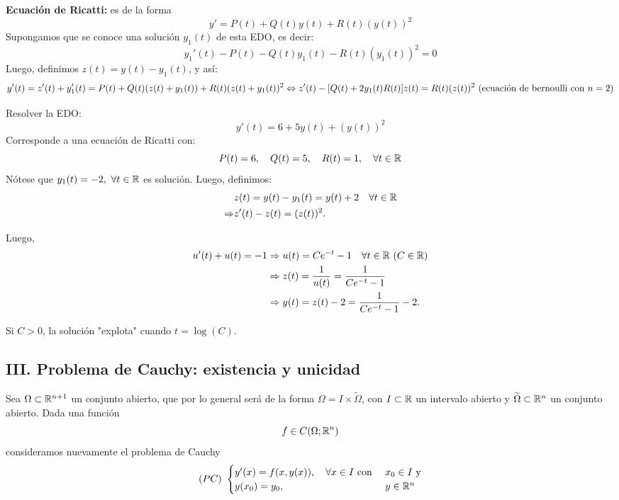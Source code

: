 	\noindent \textbf{Ecuación de Ricatti:} es de la forma
	\[ y' = P(t) + Q(t)y(t) + R(t)(y(t))^2 \]
	\noindent Supongamos que se conoce una solución $y_1(t)$ de esta EDO, es decir:
	\[ y_1'(t) - P(t) - Q(t)y_1(t) - R(t)(y_1(t))^2 = 0\]
	\noindent Luego, definimos $z(t) = y(t) - y_1(t)$, y así:
	\[ y'(t) = z'(t) + y_1'(t) = P(t) + Q(t)(z(t) + y_1(t)) + R(t)(z(t) + y_1(t))^2 \\
	\iff z'(t) - [Q(t) + 2y_1(t) R(t)] z(t) = R(t)(z(t))^2 \ (\text{ecuación de bernoulli con } n=2) \]

	\begin{eg}
		Resolver la EDO:
		\[ y'(t) = 6 + 5y(t) + (y(t))^2 \]
		\noindent Corresponde a una ecuación de Ricatti con:
		\[ P(t)=6, \quad Q(t)=5,\quad R(t)=1,\quad \forall t \in \mathbb{R} \]
		\noindent Nótese que $y_1(t) = -2,\ \forall t \in \R$ es solución. Luego, definimos:
		\begin{align*}
			& z(t) = y(t) - y_1(t) = y(t) + 2 \quad \forall t \in \mathbb{R} \\
			\Rightarrow & z'(t) - z(t) = (z(t))^2
		.\end{align*}

		\noindent Luego,
		\begin{align*}
			u'(t) + u(t) = -1 & \Rightarrow u(t) = C e^{-t} - 1 \quad \forall t \in \mathbb{R} \ (C \in \mathbb{R}) \\
			& \Rightarrow z(t) = \frac{1}{u(t)} = \frac{1}{C e^{-t} -1} \\
			& \Rightarrow y(t) = z(t) - 2 = \frac{1}{C e^{-t} -1 }-2
		.\end{align*}
	\end{eg}
		\begin{note}
			Si $C>0$, la solución "explota" cuando $ t = \log (C)$. 
		\end{note}

		\subsection{III. Problema de Cauchy: existencia y unicidad}

		Sea $\Omega \subset \mathbb{R}^{n+1}$ un conjunto abierto, que por lo general será de la forma $ \Omega = I \times \widetilde{\Omega}$, con $I \subset \mathbb{R}$ un intervalo abierto y $\widetilde{\Omega}\subset \mathbb{R}^{n}$ un conjunto abierto. Dada una función
		\[ f \in C (\Omega;\mathbb{R}^n) \]
		\noindent consideramos nuevamente el problema de Cauchy
		\begin{align*} (PC) \ \begin{cases}
			 y'(x) = f(x,y(x)), \quad \forall x \in I \text{ con } & x_0 \in I \text{ y} \\
			 y(x_0) = y_0, & y \in \mathbb{R}^n
		\end{cases} \end{align*}

